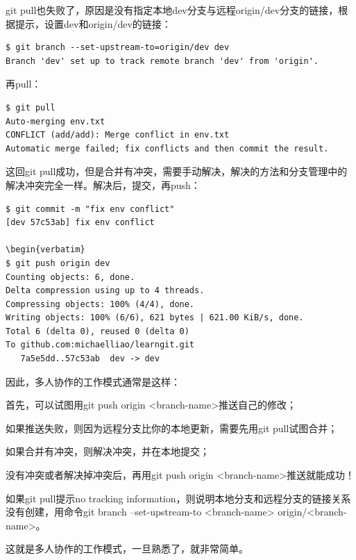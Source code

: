 git pull也失败了，原因是没有指定本地dev分支与远程origin/dev分支的链接，根据提示，设置dev和origin/dev的链接：

\begin{verbatim}
$ git branch --set-upstream-to=origin/dev dev
Branch 'dev' set up to track remote branch 'dev' from 'origin'.
\end{verbatim}

再pull：

\begin{verbatim}
$ git pull
Auto-merging env.txt
CONFLICT (add/add): Merge conflict in env.txt
Automatic merge failed; fix conflicts and then commit the result.
\end{verbatim}

这回git pull成功，但是合并有冲突，需要手动解决，解决的方法和分支管理中的解决冲突完全一样。解决后，提交，再push：

\begin{verbatim}
$ git commit -m "fix env conflict"
[dev 57c53ab] fix env conflict

\begin{verbatim}
$ git push origin dev
Counting objects: 6, done.
Delta compression using up to 4 threads.
Compressing objects: 100% (4/4), done.
Writing objects: 100% (6/6), 621 bytes | 621.00 KiB/s, done.
Total 6 (delta 0), reused 0 (delta 0)
To github.com:michaelliao/learngit.git
   7a5e5dd..57c53ab  dev -> dev
\end{verbatim}

因此，多人协作的工作模式通常是这样：

首先，可以试图用git push origin <branch-name>推送自己的修改；

如果推送失败，则因为远程分支比你的本地更新，需要先用git pull试图合并；

如果合并有冲突，则解决冲突，并在本地提交；

没有冲突或者解决掉冲突后，再用git push origin <branch-name>推送就能成功！

如果git pull提示no tracking information，则说明本地分支和远程分支的链接关系没有创建，用命令git branch --set-upstream-to <branch-name> origin/<branch-name>。

这就是多人协作的工作模式，一旦熟悉了，就非常简单。

